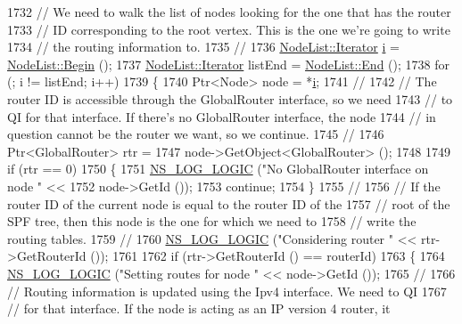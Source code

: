 \begin{DoxyCode}
1732 \textcolor{comment}{// We need to walk the list of nodes looking for the one that has the router}
1733 \textcolor{comment}{// ID corresponding to the root vertex.  This is the one we're going to write}
1734 \textcolor{comment}{// the routing information to.}
1735 \textcolor{comment}{//}
1736   \hyperlink{classns3_1_1NodeList_a9e2679a94efb4f0066cc21e65440364d}{NodeList::Iterator} \hyperlink{bernuolliDistribution_8m_a6f6ccfcf58b31cb6412107d9d5281426}{i} = \hyperlink{classns3_1_1NodeList_a93d2211831f5cb71d1dbb721e2721d7f}{NodeList::Begin} (); 
1737   \hyperlink{classns3_1_1NodeList_a9e2679a94efb4f0066cc21e65440364d}{NodeList::Iterator} listEnd = \hyperlink{classns3_1_1NodeList_a027a558c16e6078e25c7ffc67becb559}{NodeList::End} ();
1738   \textcolor{keywordflow}{for} (; i != listEnd; i++)
1739     \{
1740       Ptr<Node> node = *\hyperlink{bernuolliDistribution_8m_a6f6ccfcf58b31cb6412107d9d5281426}{i};
1741 \textcolor{comment}{//}
1742 \textcolor{comment}{// The router ID is accessible through the GlobalRouter interface, so we need}
1743 \textcolor{comment}{// to QI for that interface.  If there's no GlobalRouter interface, the node}
1744 \textcolor{comment}{// in question cannot be the router we want, so we continue.}
1745 \textcolor{comment}{// }
1746       Ptr<GlobalRouter> rtr = 
1747         node->GetObject<GlobalRouter> ();
1748 
1749       \textcolor{keywordflow}{if} (rtr == 0)
1750         \{
1751           \hyperlink{group__logging_ga88acd260151caf2db9c0fc84997f45ce}{NS\_LOG\_LOGIC} (\textcolor{stringliteral}{"No GlobalRouter interface on node "} << 
1752                         node->GetId ());
1753           \textcolor{keywordflow}{continue};
1754         \}
1755 \textcolor{comment}{//}
1756 \textcolor{comment}{// If the router ID of the current node is equal to the router ID of the }
1757 \textcolor{comment}{// root of the SPF tree, then this node is the one for which we need to }
1758 \textcolor{comment}{// write the routing tables.}
1759 \textcolor{comment}{//}
1760       \hyperlink{group__logging_ga88acd260151caf2db9c0fc84997f45ce}{NS\_LOG\_LOGIC} (\textcolor{stringliteral}{"Considering router "} << rtr->GetRouterId ());
1761 
1762       \textcolor{keywordflow}{if} (rtr->GetRouterId () == routerId)
1763         \{
1764           \hyperlink{group__logging_ga88acd260151caf2db9c0fc84997f45ce}{NS\_LOG\_LOGIC} (\textcolor{stringliteral}{"Setting routes for node "} << node->GetId ());
1765 \textcolor{comment}{//}
1766 \textcolor{comment}{// Routing information is updated using the Ipv4 interface.  We need to QI}
1767 \textcolor{comment}{// for that interface.  If the node is acting as an IP version 4 router, it}

\end{DoxyCode}
